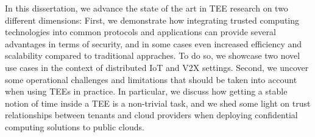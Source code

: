 In this dissertation, we advance the state of the art in \ac{TEE} research on
two different dimensions: First, we demonstrate how integrating trusted
computing technologies into common protocols and applications can provide
several advantages in terms of security, and in some cases even increased
efficiency and scalability compared to traditional appraches. To do so, we
showcase two novel use cases in the context of distributed \ac{IoT} and \ac{V2X}
settings. Second, we uncover some operational challenges and limitations that
should be taken into account when using \acp{TEE} in practice. In particular, we
discuss how getting a stable notion of time inside a \ac{TEE} is a non-trivial
task, and we shed some light on trust relationships between tenants and cloud
providers when deploying confidential computing solutions to public clouds.